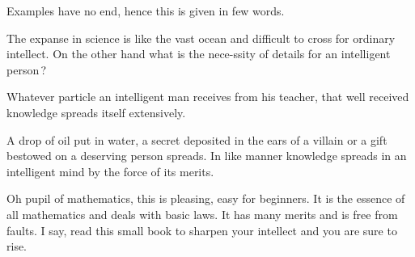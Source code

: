 \documentclass[]{article}
\begin{document}
{Examples have no end, hence this is given in few words.}
\newpage
\large

\begin{quote}  {
}  \end{quote}

{The expanse in science is like the vast ocean and difficult to cross
for ordinary intellect. On the other hand what is the nece-ssity of
details for an intelligent person\,?}

\begin{quote}  {}
\end{quote}

{Whatever particle an intelligent man receives from his teacher, that
well received knowledge spreads itself extensively.}

\begin{quote}  {
}  \end{quote}

A drop of oil put in water, a secret deposited in the ears of a villain
or a gift bestowed on a deserving person spreads. In like manner
knowledge spreads in an intelligent mind by the force of its merits.

\begin{quote}  {
}  \end{quote}

Oh pupil of mathematics, this is pleasing, easy for beginners. It is
the essence of all mathematics and deals with basic laws. It has many
merits and is free from faults. I say, read this small book to sharpen
your intellect and you are sure to rise.
\end{document}
